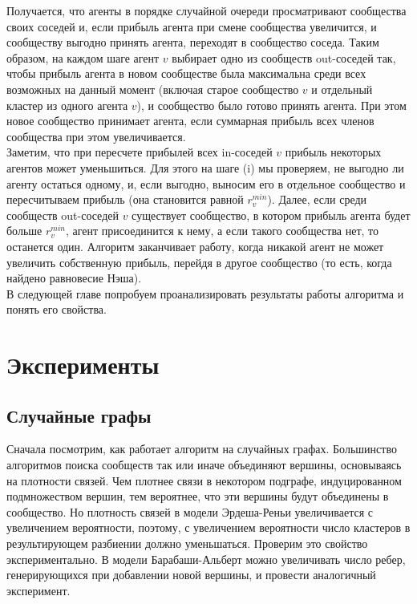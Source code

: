 Получается, что агенты в порядке случайной очереди просматривают сообщества своих соседей и, если прибыль агента при смене сообщества увеличится, и сообществу выгодно принять агента, переходят в сообщество соседа. Таким образом, на каждом шаге агент $v$ выбирает одно из сообществ out-соседей так, чтобы прибыль агента в новом сообществе была максимальна среди всех возможных на данный момент (включая старое сообщество $v$ и отдельный кластер из одного агента $v$), и сообщество было готово принять агента. При этом новое сообщество принимает агента, если суммарная прибыль всех членов сообщества при этом увеличивается.\\

Заметим, что при пересчете прибылей всех in-соседей $v$ прибыль некоторых агентов может уменьшиться. Для этого на шаге (i) мы проверяем, не выгодно ли агенту остаться одному, и, если выгодно, выносим его в отдельное сообщество и пересчитываем прибыль (она становится равной $r_v^{min}$). Далее, если среди сообществ out-соседей $v$ существует сообщество, в котором прибыль агента будет больше $r_v^{min}$, агент присоединится к нему, а если такого сообщества нет, то останется один. Алгоритм заканчивает работу, когда никакой агент не может увеличить собственную прибыль, перейдя в другое сообщество (то есть, когда найдено равновесие Нэша).\\

В следующей главе попробуем проанализировать результаты работы алгоритма и понять его свойства.

\chapter{Эксперименты}
\section{Случайные графы}
Сначала посмотрим, как работает алгоритм на случайных графах. Большинство алгоритмов поиска сообществ так или иначе объединяют вершины, основываясь на плотности связей. Чем плотнее связи в некотором подграфе, индуцированном подмножеством вершин, тем вероятнее, что эти вершины будут объединены в сообщество. Но плотность связей в модели Эрдеша-Реньи увеличивается с увеличением вероятности, поэтому, с увеличением вероятности число кластеров в  результирующем разбиении должно уменьшаться. Проверим это свойство экспериментально. В модели Барабаши-Альберт можно увеличивать число ребер, генерирующихся при добавлении новой вершины, и провести аналогичный эксперимент.

